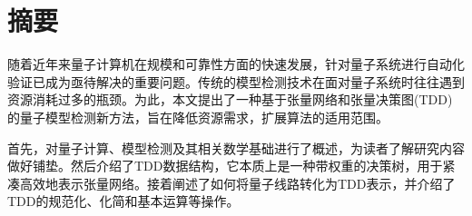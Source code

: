 
\maketitle%
\MAKETITLE%
\makedeclaration%
\intobmk\chapter*{摘\quad 要}%
\setcounter{page}{1}%




随着近年来量子计算机在规模和可靠性方面的快速发展，针对量子系统进行自动化验证已成为亟待解决的重要问题。传统的模型检测技术在面对量子系统时往往遇到资源消耗过多的瓶颈。为此，本文提出了一种基于张量网络和张量决策图(TDD)的量子模型检测新方法，旨在降低资源需求，扩展算法的适用范围。

首先，对量子计算、模型检测及其相关数学基础进行了概述，为读者了解研究内容做好铺垫。然后介绍了TDD数据结构，它本质上是一种带权重的决策树，用于紧凑高效地表示张量网络。接着阐述了如何将量子线路转化为TDD表示，并介绍了TDD的规范化、化简和基本运算等操作。

